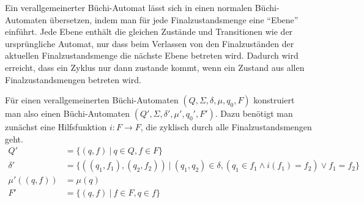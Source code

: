 Ein verallgemeinerter Büchi-Automat lässt sich in einen normalen Büchi-Automaten übersetzen, indem man für jede Finalzustandsmenge eine "`Ebene"' einführt.
Jede Ebene enthält die gleichen Zustände und Transitionen wie der ursprüngliche Automat, nur dass beim Verlassen von den Finalzuständen der aktuellen Finalzustandsmenge die nächste Ebene betreten wird.
Dadurch wird erreicht, dass ein Zyklus nur dann zustande kommt, wenn ein Zustand aus allen Finalzustandsmengen betreten wird.

Für einen verallgemeinerten Büchi-Automaten $(Q,\Sigma,\delta,\mu,q_0,F)$ konstruiert man also einen Büchi-Automaten $(Q',\Sigma,\delta',\mu',q_0',F')$.
Dazu benötigt man zunächst eine Hilfsfunktion $i : F\rightarrow F$, die zyklisch durch alle Finalzustandsmengen geht.
\begin{align*}
  Q' &= \{ (q,f)\ |\ q\in Q, f\in F \}\\
  \delta' &= \{ ((q_1,f_1),(q_2,f_2))\ |\ (q_1,q_2)\in\delta, (q_1\in f_1\land i(f_1)=f_2)\lor f_1=f_2\}\\
  \mu'((q,f)) &= \mu(q)\\
  F' &= \{ (q,f)\ |\ f\in F, q\in f \}
\end{align*}
